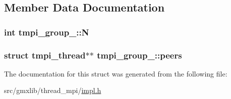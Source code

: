\subsection{\-Member \-Data \-Documentation}
\hypertarget{structtmpi__group___abb8dcfd2a40e4cd194cd90034d953ebd}{
\subsubsection[{\-N}]{\setlength{\rightskip}{0pt plus 5cm}int {\bf tmpi\-\_\-group\-\_\-\-::\-N}}}\label{structtmpi__group___abb8dcfd2a40e4cd194cd90034d953ebd}
\hypertarget{structtmpi__group___a638315fa398a4e2a1c7ecbbe99bd52f6}{
\subsubsection[{peers}]{\setlength{\rightskip}{0pt plus 5cm}struct {\bf tmpi\-\_\-thread}$\ast$$\ast$ {\bf tmpi\-\_\-group\-\_\-\-::peers}}}\label{structtmpi__group___a638315fa398a4e2a1c7ecbbe99bd52f6}


\-The documentation for this struct was generated from the following file\-:\begin{DoxyCompactItemize}
\item 
src/gmxlib/thread\-\_\-mpi/\hyperlink{impl_8h}{impl.\-h}\end{DoxyCompactItemize}
